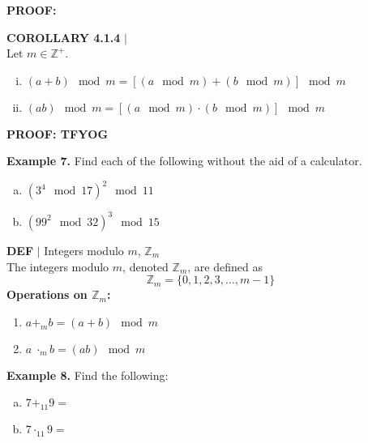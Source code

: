 \documentclass [12pt]{article}
\begin{document}
\vspace{0.25cm}
\textbf{PROOF:}
\vspace{4in}
\begin{framed}
\textbf{COROLLARY 4.1.4} $|$ \\
\vspace{0.5cm}
Let $m \in \mathbb{Z}^{+}$. \\
\begin{enumerate}[(i)]
\item $(a+b)\mod m = [(a\mod m ) + (b\mod m)]\mod m$
\item $(ab)\mod m = [(a\mod m ) \cdot (b\mod m)]\mod m$
\end{enumerate}
\end{framed}
\vspace{0.5cm}
\textbf{PROOF: TFYOG}
\pagebreak
\raggedright
\textbf{Example 7.} Find each of the following without the aid of a calculator.
\begin{multicols}{2}
\begin{enumerate}[(a)]
\item $(3^4\mod 17)^{2}\mod 11$ \columnbreak
\item $(99^2\mod 32)^3\mod 15$
\end{enumerate}
\end{multicols}
\vspace{5in}
\begin{framed}
\textbf{DEF} $|$ Integers modulo $m$, $\mathbb{Z}_m$\\
\vspace{0.5cm}
The integers modulo $m$, denoted $\mathbb{Z}_m$, are defined as
\[\mathbb{Z}_m = \{0,1, 2,3, \dots, m-1 \}\]
\textbf{Operations on $\mathbb{Z}_m$:}
\begin{enumerate}[]
\item $a +_{m} b = (a+b)\mod m$
\item $a \; \cdot_{m} b = (ab)\mod m$
\end{enumerate}
\end{framed}
\raggedright
\textbf{Example 8.} Find the following:
\begin{multicols}{2}
\begin{enumerate}[(a)]
\item $7 +_{11} 9 =$
\item $7 \cdot_{11} 9 =$
\end{enumerate}
\end{multicols}
\end{document}
